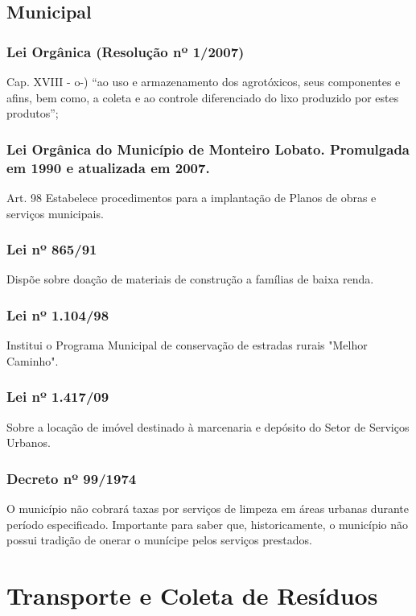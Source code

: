 \begin{subapend}
	\subsection{Municipal}
	\begin{subsubapend}
		\item \subsubsection{Lei Orgânica (Resolução nº 1/2007)}
		Cap. XVIII - o-) “ao uso e armazenamento dos agrotóxicos, seus componentes e afins, bem como, a coleta e ao controle diferenciado do lixo produzido por estes produtos”;
		\subsubsection{Lei Orgânica do Município de Monteiro Lobato. Promulgada em 1990 e atualizada em 2007.}
		Art. 98
		Estabelece procedimentos para a implantação de Planos de obras e serviços municipais.
		\subsubsection{Lei nº 865/91}
		Dispõe sobre doação de materiais de construção a famílias de baixa renda.
		\subsubsection{Lei nº 1.104/98}
		Institui o Programa Municipal de conservação de estradas rurais "Melhor Caminho".
		\subsubsection{Lei nº 1.417/09}
		Sobre a locação de imóvel destinado à marcenaria e depósito do Setor de Serviços Urbanos.
		\subsubsection{Decreto nº 99/1974}
		O município não cobrará taxas por serviços de limpeza em áreas urbanas durante período especificado. Importante para saber que, historicamente, o município não possui tradição de onerar o munícipe pelos serviços prestados.
	\end{subsubapend}
\end{subapend}

\section{Transporte e Coleta de Resíduos}

